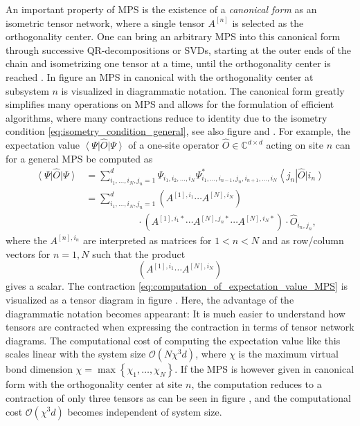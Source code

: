 An important property of MPS is the existence of a \textit{canonical form} as an isometric tensor network, where a single tensor $A^{[n]}$ is selected as the orthogonality center. One can bring an arbitrary MPS into this canonical form through successive QR-decompositions or SVDs, starting at the outer ends of the chain and isometrizing one tensor at a time, until the orthogonality center is reached \cite{cite:DMRG_in_the_age_of_MPS}. In figure  an MPS in canonical with the orthogonality center at subsystem $n$ is visualized in diagrammatic notation. The canonical form greatly simplifies many operations on MPS and allows for the formulation of efficient algorithms, where many contractions reduce to identity due to the isometry condition \eqref{eq:isometry_condition_general}, see also figure  and . For example, the expectation value $\left\langle\Psi\right|\hat{O}\left|\Psi\right\rangle$ of a one-site operator $\hat{O} \in \mathbb{C}^{d\times d}$ acting on site $n$ can for a general MPS be computed as
\begin{equation}
\begin{split}
	\label{eq:computation_of_expectation_value_MPS}
	\left\langle\Psi\right|\hat{O}\left|\Psi\right\rangle &=\sum_{i_1,\dots,i_N,j_n=1}^{d}\Psi_{i_1,i_2,\dots,i_N} \Psi_{i_1,\dots,i_{n-1},j_n,i_{n+1},\dots,i_N}^* \left\langle j_n\right|\hat{O} \left|i_n\right\rangle \\
	&= \sum_{i_1,\dots,i_N,j_n=1}^{d} \left(A^{[1],i_1}\cdots A^{[N],i_N}\right) \\
	&\quad\quad\quad\quad\quad\,\,\cdot\left(A^{[1],i_1*}\cdots A^{[N],j_n*} \cdots A^{[N],i_N*}\right)\cdot \hat{O}_{i_n,j_n},
\end{split}
\end{equation}
where the $A^{[n],i_n}$ are interpreted as matrices for $1 < n < N$ and as row/column vectors for $n = 1, N$ such that the product
\begin{equation}
	\left(A^{[1],i_1}\cdots A^{[N],i_N}\right)
\end{equation}
gives a scalar. The contraction \eqref{eq:computation_of_expectation_value_MPS} is visualized as a tensor diagram in figure . Here, the advantage of the diagrammatic notation becomes appearant: It is much easier to understand how tensors are contracted when expressing the contraction in terms of tensor network diagrams. The computational cost of computing the expectation value like this scales linear with the system size $\mathcal{O}\left(N\chi^3d\right)$, where $\chi$ is the maximum virtual bond dimension $\chi = \max\left\{\chi_1,\dots,\chi_N\right\}$. If the MPS is however given in canonical form with the orthogonality center at site $n$, the computation reduces to a contraction of only three tensors as can be seen in figure , and the computational cost $\mathcal{O}\left(\chi^3d\right)$ becomes independent of system size. \par
